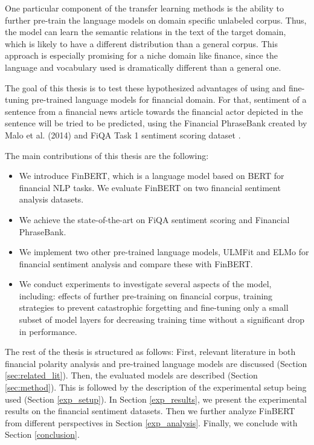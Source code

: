 \documentclass[../main.tex]{subfiles}
\begin{document}
One particular component of the transfer learning methods is the ability to further pre-train the language models on domain specific unlabeled corpus. Thus, the model can learn the semantic relations in the text of the target domain, which is likely to have a different distribution than a general corpus. This approach is especially promising for a niche domain like finance, since the language and vocabulary used is dramatically different than a general one.   

The goal of this thesis is to test these hypothesized advantages of using and fine-tuning pre-trained language models for financial domain. For that, sentiment of a sentence from a financial news article towards the financial actor depicted in the sentence will be tried to be predicted, using the Financial PhraseBank created by Malo et al. (2014) \cite{Malo2014} and FiQA Task 1 sentiment scoring dataset \cite{Maia2018}. 

The main contributions of this thesis are the following:
\begin{itemize}
    \item We introduce FinBERT, which is a language model based on BERT for financial NLP tasks. We evaluate FinBERT on two financial sentiment analysis datasets. 
    \item We achieve the state-of-the-art on FiQA sentiment scoring and Financial PhraseBank.
    \item We implement two other pre-trained language models, ULMFit and ELMo for financial sentiment analysis and compare these with FinBERT.  
    \item We conduct experiments to investigate several aspects of the model, including: effects of further pre-training on financial corpus, training strategies to prevent catastrophic forgetting and fine-tuning only a small subset of model layers for decreasing training time without a significant drop in performance. 
\end{itemize}

The rest of the thesis is structured as follows: First, relevant literature in both financial polarity analysis and pre-trained language models are discussed (Section \ref{sec:related_lit}). Then, the evaluated models are described (Section \ref{sec:method}). This is followed by the description of the experimental setup being used (Section \ref{exp_setup}). In Section \ref{exp_results}, we present the experimental results on the financial sentiment datasets. Then we further analyze FinBERT from different perspectives in Section \ref{exp_analysis}. Finally, we conclude with Section \ref{conclusion}.
\end{document}
